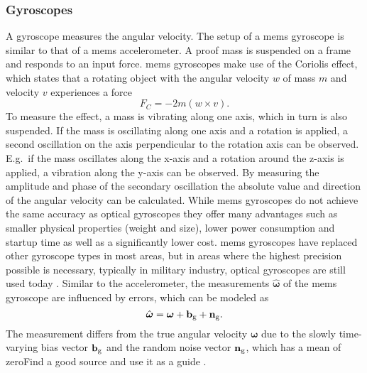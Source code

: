 \subsubsection{ Gyroscopes}
A gyroscope measures the angular velocity.
The setup of a \gls{mems} gyroscope is similar to that of a \gls{mems} accelerometer.
A proof mass is suspended on a frame and responds to an input force.
\gls{mems} gyroscopes make use of the Coriolis effect, which states that a rotating object with the angular velocity $w$ of mass $m$ and velocity $v$ experiences a force
\begin{equation}
	F_C = -2m(w\times v).
\end{equation}
To measure the effect, a mass is vibrating along one axis, which in turn is also suspended.
If the mass is oscillating along one axis and a rotation is applied, a second oscillation on the axis perpendicular to the rotation axis can be observed.
E.g.\ if the mass oscillates along the x-axis and a rotation around the z-axis is applied, a vibration along the y-axis can be observed.
By measuring the amplitude and phase of the secondary oscillation the absolute value and direction of the angular velocity can be calculated.
While \gls{mems} gyroscopes do not achieve the same accuracy as optical gyroscopes they offer many advantages such as smaller physical properties (weight and size), lower power consumption and startup time as well as a significantly lower cost.
\gls{mems} gyroscopes have replaced other gyroscope types in most areas, but in areas where the highest precision possible is necessary, typically in military industry, optical gyroscopes are still used today \cite{Perlmutter2016}.
Similar to the accelerometer, the measurements $\hat{\boldsymbol{\omega}}$ of the \gls{mems} gyroscope are influenced by errors, which can be modeled as
\begin{equation}
	\hat{\boldsymbol{\omega}} = \boldsymbol{\omega} + \vb{b}_\mathrm{g} + \vb{n}_\mathrm{g}.
\end{equation}
The measurement differs from the true angular velocity $\boldsymbol{\omega}$ due to the slowly time-varying bias vector $\vb{b}_\mathrm{g}$ and the random noise vector $\vb{n}_\mathrm{g}$, which has a mean of zeroFind a good source and use it as a guide \cite{Lefferts1982}.

